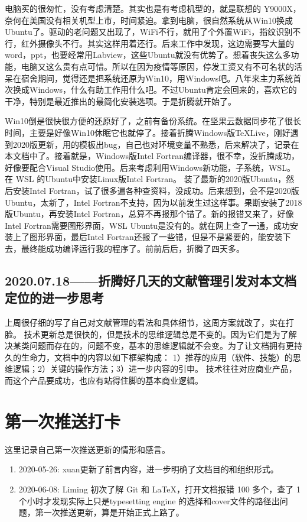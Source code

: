 \documentclass[cn,11pt,chinese,twoside]{elegantbook}
\begin{document}
电脑买的很匆忙，没有考虑清楚。其实也是有考虑机型的，就是联想的 Y9000X，奈何在美国没有相关机型上市，时间紧迫。拿到电脑，很自然系统从Win10换成Ubuntu了。驱动的老问题又出现了，WiFi不行，就用了个外置WiFi，指纹识别不行，红外摄像头不行。其实这样用着还行。后来工作中发现，这边需要写大量的word，ppt，也要经常用Labview，这些Ubuntu就没有优势了。想着丧失这么多功能，电脑又这么贵有点可惜。所以在因为疫情等原因，停发工资又有不可名状的活呆在宿舍期间，觉得还是把系统还原为Win10，用Windows吧。八年来主力系统首次换成Windows，什么有助工作用什么吧。不过Ubuntu肯定会回来的，喜欢它的干净，特别是最近推出的最简化安装选项。于是折腾就开始了。

Win10倒是很快很方便的还原好了，之前有备份系统。在坚果云数据同步花了很长时间，主要是好像Win10休眠它也就停了。接着折腾Windows版\TeX Live，刚好遇到2020版更新，用的模板出bug，自己也对环境变量不熟悉，后来解决了，记录在本文档中了。接着就是，Windows版Intel Fortran编译器，很不幸，没折腾成功，好像要配合Visual Studio使用。后来考虑利用Windows新功能，子系统，WSL。在 WSL 的Ubuntu中安装Linux版Intel Fortran。 装了最新的2020版Ubuntu，然后安装Intel Fortran，试了很多遍各种查资料，没成功。后来想到，会不是2020版Ubuntu，太新了，Intel Fortran不支持，因为以前发生过这样事。果断安装了2018版Ubuntu，再安装Intel Fortran，总算不再报那个错了。新的报错又来了，好像Intel Fortran需要图形界面，WSL Ubuntu是没有的。就在网上查了一通，成功安装上了图形界面，最后Intel Fortran还报了一些错，但是不是紧要的，能安装下去，最终能成功编译运行我的程序了。前前后后，折腾了四天多。




\subsection*{2020.07.18——折腾好几天的文献管理引发对本文档定位的进一步思考}
上周很仔细的写了自己对文献管理的看法和具体细节，这周方案就改了，实在打脸。
技术更新总是很快的，但是技术的思维逻辑总是不变的。因为它们是为了解决某类问题而存在的，问题不变，基本的思维逻辑就不会变。为了让文档拥有更持久的生命力，文档中的内容以如下框架构成：
1）推荐的应用（软件、技能）的思维逻辑；2）关键的操作方法；3）进一步内容的引申。
技术往往对应商业产品，而这个产品要成功，也应有站得住脚的基本商业逻辑。



\section*{第一次推送打卡}
这里记录自己第一次推送更新的情形和感言。
\begin{enumerate}
\item 2020-05-26: xuan更新了前言内容，进一步明确了文档目的和组织形式。
\item 2020-06-08: Liming 初次了解 Git 和 \LaTeX{}，打开文档报错 100 多个，查了 1 个小时才发现实际上只是typesetting engine 的选择和cover文件的路径出问题，第一次推送更新，算是开始正式上路了。
\end{enumerate}
\end{document}
